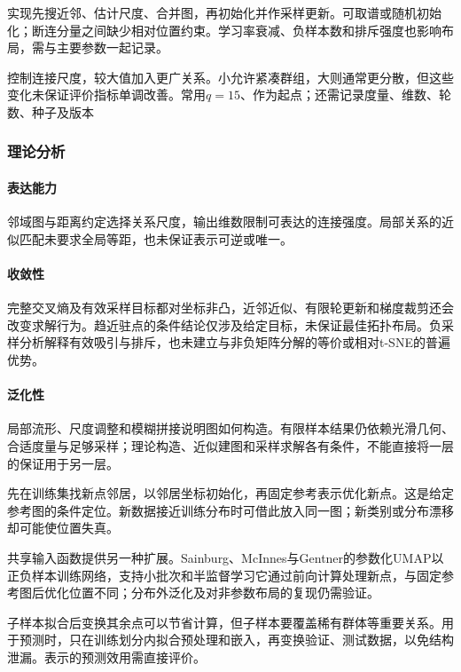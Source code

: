 实现先搜近邻、估计尺度、合并图，再初始化并作采样更新。可取谱或随机初始化；断连分量之间缺少相对位置约束。学习率衰减、负样本数和排斥强度也影响布局，需与主要参数一起记录。

控制连接尺度，较大值加入更广关系。小允许紧凑群组，大则通常更分散，但这些变化未保证评价指标单调改善。常用$q=15$、作为起点；还需记录度量、维数、轮数、种子及版本

\subsubsection{理论分析}
\label{sec:dim-umap-theory}

\paragraph{表达能力}
邻域图与距离约定选择关系尺度，输出维数限制可表达的连接强度。局部关系的近似匹配未要求全局等距，也未保证表示可逆或唯一。

\paragraph{收敛性}

完整交叉熵及有效采样目标都对坐标非凸，近邻近似、有限轮更新和梯度裁剪还会改变求解行为。趋近驻点的条件结论仅涉及给定目标，未保证最佳拓扑布局。负采样分析解释有效吸引与排斥，也未建立与非负矩阵分解的等价或相对t-SNE的普遍优势。

\paragraph{泛化性}

局部流形、尺度调整和模糊拼接说明图如何构造。有限样本结果仍依赖光滑几何、合适度量与足够采样；理论构造、近似建图和采样求解各有条件，不能直接将一层的保证用于另一层。

先在训练集找新点邻居，以邻居坐标初始化，再固定参考表示优化新点。这是给定参考图的条件定位。新数据接近训练分布时可借此放入同一图；新类别或分布漂移却可能使位置失真。

共享输入函数提供另一种扩展。Sainburg、McInnes与Gentner的参数化UMAP以正负样本训练网络，支持小批次和半监督学习它通过前向计算处理新点，与固定参考图后优化位置不同；分布外泛化及对非参数布局的复现仍需验证。

子样本拟合后变换其余点可以节省计算，但子样本要覆盖稀有群体等重要关系。用于预测时，只在训练划分内拟合预处理和嵌入，再变换验证、测试数据，以免结构泄漏。表示的预测效用需直接评价。

